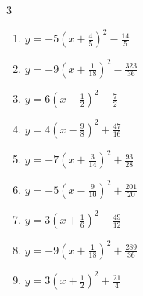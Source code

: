 \begin{multicols}{3}
\begin{enumerate}
        \phantom{$\displaystyle 頂点\left( 4 , 9 \right)$}

  \item $\displaystyle y=-5\left( x+\frac{4}{5}\right)^{2}-\frac{14}{5}$


  \item $\displaystyle y=-9\left( x+\frac{1}{18}\right)^{2}-\frac{323}{36}$


  \item $\displaystyle y=6\left( x-\frac{1}{2}\right)^{2}-\frac{7}{2}$


  \item $\displaystyle y=4\left( x-\frac{9}{8}\right)^{2}+\frac{47}{16}$


\columnbreak %

  \item $\displaystyle y=-7\left( x+\frac{3}{14}\right)^{2}+\frac{93}{28}$


  \item $\displaystyle y=-5\left( x-\frac{9}{10}\right)^{2}+\frac{201}{20}$


  \item $\displaystyle y=3\left( x+\frac{1}{6}\right)^{2}-\frac{49}{12}$


  \item $\displaystyle y=-9\left( x+\frac{1}{18}\right)^{2}+\frac{289}{36}$


  \item $\displaystyle y=3\left( x+\frac{1}{2}\right)^{2}+\frac{21}{4}$



\end{enumerate}
\end{multicols}
